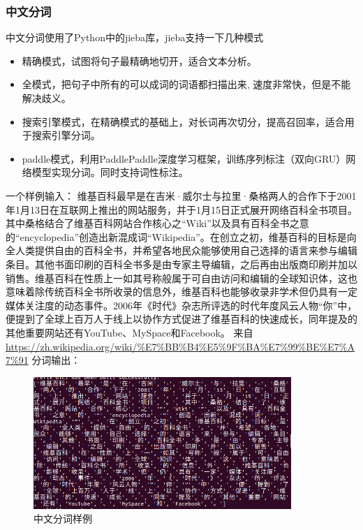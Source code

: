 \documentclass{article}
\begin{document}
\begin{CJK*}{UTF8}{gbsn}
\subsubsection{中文分词}
\qquad 中文分词使用了Python中的jieba\cite{jieba}库，jieba支持一下几种模式
\begin{itemize}
  \item 精确模式，试图将句子最精确地切开，适合文本分析。
  \item 全模式，把句子中所有的可以成词的词语都扫描出来, 速度非常快，但是不能解决歧义。
  \item 搜索引擎模式，在精确模式的基础上，对长词再次切分，提高召回率，适合用于搜索引擎分词。
  \item paddle模式，利用PaddlePaddle深度学习框架，训练序列标注（双向GRU）网络模型实现分词。同时支持词性标注。
\end{itemize}
一个样例输入：\newline
\qquad 维基百科最早是在吉米·威尔士与拉里·桑格两人的合作下于2001年1月13日在互联网上推出的网站服务，并于1月15日正式展开网络百科全书项目。其中桑格结合了维基百科网站合作核心之“Wiki”以及具有百科全书之意的“encyclopedia”创造出新混成词“Wikipedia”。在创立之初，维基百科的目标是向全人类提供自由的百科全书，并希望各地民众能够使用自己选择的语言来参与编辑条目。其他书面印刷的百科全书多是由专家主导编辑，之后再由出版商印刷并加以销售。维基百科在性质上一如其号称般属于可自由访问和编辑的全球知识体，这也意味着除传统百科全书所收录的信息外，维基百科也能够收录非学术但仍具有一定媒体关注度的动态事件。2006年《时代》杂志所评选的时代年度风云人物“你”中，便提到了全球上百万人于线上以协作方式促进了维基百科的快速成长，同年提及的其他重要网站还有YouTube、MySpace和Facebook。
来自 \url{https://zh.wikipedia.org/wiki/%E7%BB%B4%E5%9F%BA%E7%99%BE%E7%A7%91}
\newline
分词输出：\newline
\begin{figure}[H]
\centering
\includegraphics[height=5cm]{cut_words_cn.png}
\caption{中文分词样例}
\end{figure}

\end{CJK*}
\end{document}
